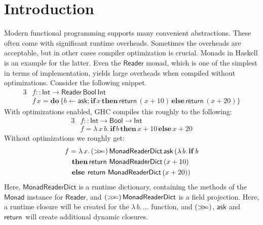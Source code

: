 \documentclass[acmsmall,screen,review,anonymous]{acmart}
\newcommand{\msf}[1]{\mathsf{#1}}
\newcommand{\mbf}[1]{\mathbf{#1}}
\newcommand{\mdo}{\mbf{do}\,}
\newcommand{\ind}{\hspace{1em}}
\newcommand{\bif}{\mbf{if}\,}
\newcommand{\bthen}{\mbf{then}\,}
\newcommand{\belse}{\mbf{else}\,}
\newcommand{\return}{\msf{return}\,}
\newcommand{\lam}{\lambda\,}
\newcommand{\Int}{\msf{Int}}
\newcommand{\Reader}{\msf{Reader}}
\newcommand{\Monad}{\msf{Monad}}
\newcommand{\Bool}{\msf{Bool}}
\newcommand{\fro}{\leftarrow}
\newcommand{\bind}{\mathbin{>\!\!>\mkern-6.7mu=}}
\begin{document}


\maketitle


\section{Introduction}\label{sec:introduction}

Modern functional programming supports many convenient abstractions. These often
come with significant runtime overheads. Sometimes the overheads are acceptable,
but in other cases compiler optimization is crucial. Monads in Haskell is an
example for the latter. Even the $\Reader$ monad, which is one of the simplest
in terms of implementation, yields large overheads when compiled without
optimizations. Consider the following snippet.
\begin{alignat*}{3}
  &f :: \Int \to \Reader\,\Bool\,\Int \\
  &f\,x = \mdo\{b \fro \msf{ask}; \bif x\, \bthen \return (x + 10)\, \belse \return (x + 20)\}
\end{alignat*}
With optimizations enabled, GHC compiles this roughly to the following:
\begin{alignat*}{3}
  &f :: \Int \to \Bool \to \Int \\
  &f = \lam x\,b.\, \bif b\, \bthen x + 10\, \belse x + 20
\end{alignat*}
Without optimizations we roughly get:
\begin{alignat*}{3}
  &f = \lam x.\,(\bind)\,\msf{MonadReaderDict}\,\msf{ask}\,(\lam b.\,\bif b\\
  &\ind \bthen\return\,\msf{MonadReaderDict}\,(x + 10)\\
  &\ind \belse\hspace{0.25em}\return\,\msf{MonadReaderDict}\,(x + 20))
\end{alignat*}
Here, $\msf{MonadReaderDict}$ is a runtime dictionary, containing the methods of
the $\Monad$ instance for $\Reader$, and $(\bind)\,\msf{MonadReaderDict}$ is a
field projection. Here, a runtime closure will be created for the $\lam b.\,...$
function, and $(\bind)$, $\msf{ask}$ and $\return$ will create additional dynamic
closures.
\end{document}
